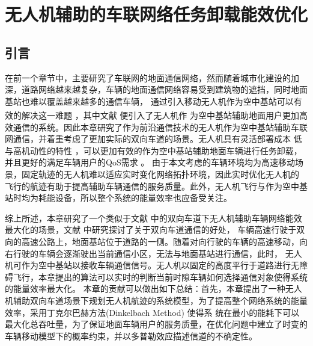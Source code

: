 \chapter{无人机辅助的车联网络任务卸载能效优化}
\label{chap:table第四章}
\section{引言}\label{section4-1}
\label{chap:introduction第四章}
在前一个章节中，主要研究了车联网的地面通信网络，然而随着城市化建设的加深，道路网络越来越复杂，车辆的地面通信网络容易受到建筑物的遮挡，同时地面基站也难以覆盖越来越多的通信车辆，
通过引入移动无人机作为空中基站可以有效的解决这一难题  \textsuperscript{\cite{Effect2020,Performance2022}}，其中文献 \cite{WirelessRelay5937283} 便引入了无人机作
为空中基站辅助地面用户更加高效通信的系统。因此本章研究了作为前沿通信技术的无人机作为空中基站辅助车联网通信，并着重考虑了更加实际的双向车道的场景。无人机具有灵活部署成本
低与高机动性的特性  \supercite{无人机技术辅助的车联网,王智煊2023无人机辅助下的车联边缘计算卸载机制研究,Joint9453853}，可以更加有效的作为空中基站辅助地面车辆进行任务卸载，
并且更好的满足车辆用户的QoS需求 \supercite{无人机QoS9373692}。 由于本文考虑的车辆环境均为高速移动场景，固定轨迹的无人机难以适应实时变化网络拓扑环境，因此实时优化无人机的
飞行的航迹有助于提高辅助车辆通信的服务质量。此外，无人机飞行与作为空中基站时均为耗能设备，所以整个系统的能量效率也应备受关注。

综上所述，本章研究了一个类似于文献 \cite{twoway7091030} 中的双向车道下无人机辅助车辆网络能效最大化的场景，文献 \cite{twoway5753961,twoway575396233,Spatial4490168,Stochastic6576809} 中研究探讨了关于双向车道通信的好处，
车辆高速行驶于双向的高速公路上，地面基站位于道路的一侧。随着对向行驶的车辆的高速移动，向右行驶的车辆会逐渐驶出当前通信小区，无法与地面基站进行通信，此时，
无人机可作为空中基站以接收车辆通信信号。无人机以固定的高度平行于道路进行无障碍飞行，本章提出的算法可以实时的判断当前时隙车辆如何选择通信对象使得系统的能量效率最大化。
本章的贡献可以做出如下总结：首先，本章提出了一种无人机辅助双向车道场景下规划无人机航迹的系统模型，为了提高整个网络系统的能量效率，采用丁克尔巴赫方法(Dinkelbach Method) 使得系
统在最小的能耗下可以最大化总吞吐量，为了保证地面车辆用户的服务质量，在优化问题中建立了时变的车辆移动模型下的概率约束，并以多普勒效应描述信道的不确定性。
